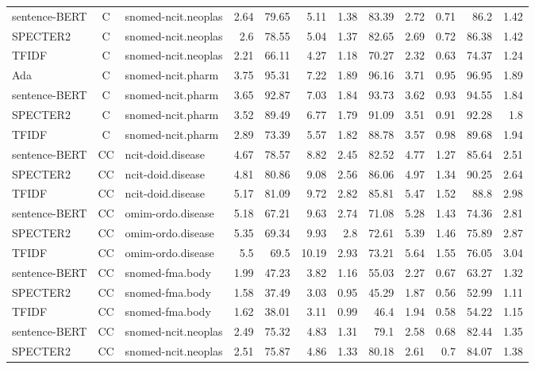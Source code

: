 \begin{table}[h]
\begin{tabular}{|l|c|l|r|r|r|r|r|r|r|r|r|}
	sentence-BERT  & C & snomed-ncit.neoplas  & 2.64 & 79.65 & 5.11 & 1.38 & 83.39 & 2.72 & 0.71 & 86.2 & 1.42\\
	SPECTER2  & C & snomed-ncit.neoplas  & 2.6 & 78.55 & 5.04 & 1.37 & 82.65 & 2.69 & 0.72 & 86.38 & 1.42\\
	TFIDF  & C & snomed-ncit.neoplas  & 2.21 & 66.11 & 4.27 & 1.18 & 70.27 & 2.32 & 0.63 & 74.37 & 1.24\\
	\hline
	Ada  & C & snomed-ncit.pharm  & 3.75 & 95.31 & 7.22 & 1.89 & 96.16 & 3.71 & 0.95 & 96.95 & 1.89\\
	sentence-BERT  & C & snomed-ncit.pharm  & 3.65 & 92.87 & 7.03 & 1.84 & 93.73 & 3.62 & 0.93 & 94.55 & 1.84\\
	SPECTER2  & C & snomed-ncit.pharm  & 3.52 & 89.49 & 6.77 & 1.79 & 91.09 & 3.51 & 0.91 & 92.28 & 1.8\\
	TFIDF  & C & snomed-ncit.pharm  & 2.89 & 73.39 & 5.57 & 1.82 & 88.78 & 3.57 & 0.98 & 89.68 & 1.94\\
	\hline
	sentence-BERT  & CC & ncit-doid.disease  & 4.67 & 78.57 & 8.82 & 2.45 & 82.52 & 4.77 & 1.27 & 85.64 & 2.51\\
	SPECTER2  & CC & ncit-doid.disease  & 4.81 & 80.86 & 9.08 & 2.56 & 86.06 & 4.97 & 1.34 & 90.25 & 2.64\\
	TFIDF  & CC & ncit-doid.disease  & 5.17 & 81.09 & 9.72 & 2.82 & 85.81 & 5.47 & 1.52 & 88.8 & 2.98\\
	\hline
	sentence-BERT  & CC & omim-ordo.disease  & 5.18 & 67.21 & 9.63 & 2.74 & 71.08 & 5.28 & 1.43 & 74.36 & 2.81\\
	SPECTER2  & CC & omim-ordo.disease  & 5.35 & 69.34 & 9.93 & 2.8 & 72.61 & 5.39 & 1.46 & 75.89 & 2.87\\
	TFIDF  & CC & omim-ordo.disease  & 5.5 & 69.5 & 10.19 & 2.93 & 73.21 & 5.64 & 1.55 & 76.05 & 3.04\\
	\hline
	sentence-BERT  & CC & snomed-fma.body  & 1.99 & 47.23 & 3.82 & 1.16 & 55.03 & 2.27 & 0.67 & 63.27 & 1.32\\
	SPECTER2  & CC & snomed-fma.body  & 1.58 & 37.49 & 3.03 & 0.95 & 45.29 & 1.87 & 0.56 & 52.99 & 1.11\\
	TFIDF  & CC & snomed-fma.body  & 1.62 & 38.01 & 3.11 & 0.99 & 46.4 & 1.94 & 0.58 & 54.22 & 1.15\\
	\hline
	sentence-BERT  & CC & snomed-ncit.neoplas  & 2.49 & 75.32 & 4.83 & 1.31 & 79.1 & 2.58 & 0.68 & 82.44 & 1.35\\
	SPECTER2  & CC & snomed-ncit.neoplas  & 2.51 & 75.87 & 4.86 & 1.33 & 80.18 & 2.61 & 0.7 & 84.07 & 1.38\\

\end{tabular}
\end{table}
